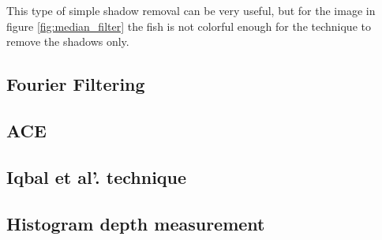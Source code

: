 This type of simple shadow removal can be very useful, but for the image in figure \ref{fig:median_filter} the fish is not colorful enough for the technique to remove the shadows only.


\subsection{Fourier Filtering}


\subsection{ACE}


\subsection{Iqbal et al'. technique}


\subsection{Histogram depth measurement}